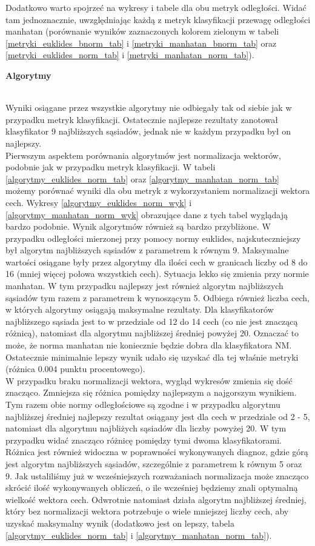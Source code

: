 \documentclass[12pt]{article}
\begin{document}
\indent Dodatkowo warto spojrzeć na wykresy i tabele dla obu metryk odległości. Widać tam jednoznacznie, uwzględniając każdą z metryk klasyfikacji przewagę odległości manhatan (porównanie wyników zaznaczonych kolorem zielonym w tabeli \ref{metryki_euklides_bnorm_tab} i \ref{metryki_manhatan_bnorm_tab} oraz \ref{metryki_euklides_norm_tab} i \ref{metryki_manhatan_norm_tab}).\\
\centerline{\textbf{Algorytmy }}\\
\indent Wyniki osiągane przez wszystkie algorytmy nie odbiegały tak od siebie jak w przypadku metryk klasyfikacji. Ostatecznie najlepsze rezultaty zanotował klasyfikator 9 najbliższych sąsiadów, jednak nie w każdym przypadku był on najlepszy. \\
\indent Pierwszym aspektem porównania algorytmów jest normalizacja wektorów, podobnie jak w przypadku metryk klasyfikacji. W tabeli \ref{algorytmy_euklides_norm_tab} oraz \ref{algorytmy_manhatan_norm_tab} możemy porównać wyniki dla obu metryk z wykorzystaniem normalizacji wektora cech. 
Wykresy \ref{algorytmy_euklides_norm_wyk} i \ref{algorytmy_manhatan_norm_wyk} obrazujące dane z tych tabel wyglądają bardzo podobnie. Wynik algorytmów również są bardzo przybliżone. W przypadku odległości mierzonej przy pomocy  normy euklides, najskuteczniejszy był algorytm najbliższych sąsiadów z parametrem k równym 9. Maksymalne wartości osiągane były przez algorytmy dla ilości cech w granicach liczby od 8 do 16 (mniej więcej połowa wszystkich cech). Sytuacja lekko się zmienia przy normie manhatan. W tym przypadku  najlepszy jest również algorytm najbliższych sąsiadów tym razem z parametrem k wynoszącym 5. Odbiega również liczba cech, w których algorytmy osiągają maksymalne rezultaty. Dla klasyfikatorów najbliższego sąsiada jest to w przedziale od 12 do 14 cech (co nie jest znaczącą różnicą), natomiast dla algorytmu najbliższej średniej powyżej 20. Oznaczać to może, że norma manhatan nie koniecznie będzie dobra dla klasyfikatora NM. Ostatecznie minimalnie lepszy wynik udało się uzyskać dla tej właśnie metryki (różnica 0.004 punktu procentowego).\\
\indent W przypadku braku normalizacji wektora, wygląd wykresów zmienia się dość znacząco. Zmniejsza się różnica pomiędzy najlepszym a najgorszym wynikiem. Tym razem obie normy odległościowe są zgodne i w przypadku algorytmu najbliższej średniej najlepszy rezultat osiągany jest dla cech w przedziale od 2 - 5, natomiast dla algorytmu najbliżych sąsiadów dla liczby powyżej 20. W tym przypadku widać znacząco różnicę pomiędzy tymi dwoma klasyfikatorami. Różnica jest również widoczna w poprawności wykonywanych diagnoz, gdzie górą jest algorytm najbliższych sąsiadów, szczególnie z parametrem k równym 5 oraz 9. Jak ustaliliśmy już w wcześniejszych rozważaniach normalizacja może znacząco skrócić ilość wykonywanych obliczeń, o ile wcześniej będziemy znali optymalną wielkość wektora cech. Odwrotnie natomiast działa algorytm najbliższej średniej, który bez normalizacji wektora potrzebuje o wiele mniejszej liczby cech, aby uzyskać maksymalny wynik (dodatkowo jest on lepszy, tabela \ref{algorytmy_euklides_norm_tab} i \ref{algorytmy_manhatan_norm_tab}). \\
\end{document}
